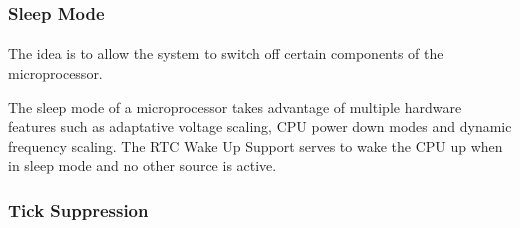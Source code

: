 \subsubsection{Sleep Mode}
\paragraph{}
The idea is to allow the system to switch off certain components of the microprocessor.

The sleep mode of a microprocessor takes advantage of multiple hardware features
    such as adaptative voltage scaling, CPU power down modes and dynamic frequency scaling.
The RTC Wake Up Support serves to wake the CPU up when in sleep mode and no other source is active.

\subsubsection{Tick Suppression}
\paragraph{}